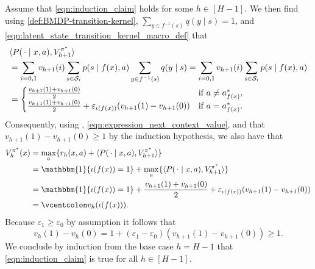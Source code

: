 \documentclass[11pt]{article}
\newcommand{\defeq}{=\vcentcolon}
\newcommand{\mcS}{\mathcal{S}}
\theoremstyle{definition}
\theoremstyle{definition}
\begin{document}
Assume that \eqref{eqn:induction_claim} holds for some $h\in[H-1]$.
We then find using \eqref{def:BMDP-transition-kernel}, $\sum_{y\in f^{-1}(s)}q(y \mid s)=1$, and \eqref{eqn:latent_state_transition_kernel_macro_def} that
\begin{equation}
	\label{eqn:expression_next_context_value}
	\begin{split}
		 &
		\langle P(\,\cdot\mid x,a), V^{\pi^*}_{h+1}\rangle
		\\
		 &
		=
		\sum_{i=0,1}
		v_{h+1}(i)
		\sum_{s\in\mcS_i}
		p(s \mid f(x),a)
		\sum_{y\in f^{-1}(s)}
		q(y \mid s)
		=
		\sum_{i=0,1}
		v_{h+1}(i)
		\sum_{s\in\mcS_i}
		p(s \mid f(x),a)
		\\
		 &
		=
		\begin{cases}
			\frac{v_{h+1}(1)+v_{h+1}(0)}{2}
			 &
			\textnormal{if } a\neq a_{f(x)}^*,
			\\
			\frac{v_{h+1}(1)+v_{h+1}(0)}{2}
			+
			\varepsilon_{\iota(f(x))}(v_{h+1}(1)-v_{h+1}(0))
			 &
			\textnormal{if } a=a_{f(x)}^*
			.
		\end{cases}
	\end{split}
\end{equation}
Consequently, using , \eqref{eqn:expression_next_context_value}, and that $v_{h+1}(1)-v_{h+1}(0)\geq 1$ by the induction hypothesis, we also have that
\begin{align}
	V^{\pi^*}_{h}(x)
	 &
	=
	\max_{a}
	\{
	r_{h}(x,a)
	+
	\langle P(\,\cdot\mid  x,a), V^{\pi^*}_{h+1} \rangle
	\}
	\nonumber
	\\
	 &
	=
	\mathbbm{1}\{\iota(f(x)) = 1\}
	+
	\max_{a}
	\{
	\langle P(\,\cdot\mid  x,a), V^{\pi^*}_{h+1} \rangle
	\}
	\\
	 &
	=
	\mathbbm{1}\{\iota(f(x)) = 1\}
	+
	\frac{v_{h+1}(1)+v_{h+1}(0)}{2}
	+
	\varepsilon_{\iota(f(x))}(v_{h+1}(1)-v_{h+1}(0))
	\nonumber
	\\
	 &
	\defeq
	v_{h}(\iota(f(x)))
	.
	\nonumber
\end{align}
Because $\varepsilon_{1}\geq \varepsilon_{0}$ by assumption it follows that
\begin{equation}
	v_{h}(1)- v_{h}(0)
	=
	1
	+
	(\varepsilon_{1}-\varepsilon_{0})(v_{h+1}(1)-v_{h+1}(0))
	\geq
	1
	.
\end{equation}
We conclude by induction from the base case $h=H-1$ that \eqref{eqn:induction_claim} is true for all $h\in[H-1]$.
\end{document}

